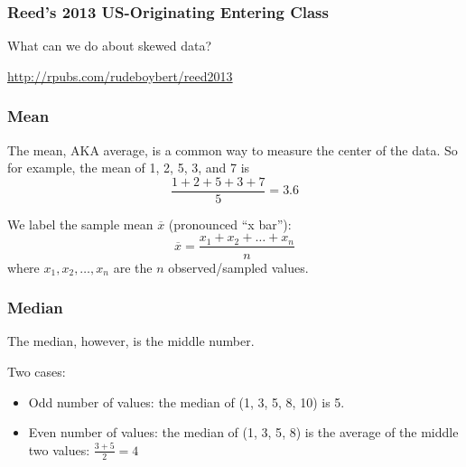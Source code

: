 \documentclass[handout]{beamer}
\newcommand{\blue}[1]{\textcolor{blue2}{#1}}
\begin{document}
\begin{frame}
\frametitle{Reed's 2013 US-Originating Entering Class}
What can we do about skewed data?  

\vspace{1cm}

\blue{\url{http://rpubs.com/rudeboybert/reed2013}}

\end{frame}


\begin{frame}[fragile]
\frametitle{Mean}

%
%
The mean, AKA average, is a common way to measure the \blue{center} of the data.  So for example, the mean of 1, 2, 5, 3, and 7 is 
\[\frac{1 + 2 + 5 + 3 + 7}{5} = 3.6\]

\pause We label the \blue{sample mean} $\overline{x}$ (pronounced ``x bar''):
\[
\overline{x} = \frac{x_1 + x_2 + \ldots + x_n}{n}
\]
where $x_1, x_2, \ldots, x_n$ are the $n$ observed/sampled values.  
\end{frame}


\begin{frame}[fragile]
\frametitle{Median}
%
%
The \blue{median}, however, is the \blue{middle number}.

\vspace{0.5cm}

\pause Two cases:
\begin{itemize}
\item Odd number of values: the median of (1, 3, \blue{5}, 8, 10) is 5.
\item Even number of values: the median of (1, \blue{3, 5}, 8) is the average of the middle two values: $\frac{3+5}{2} = 4$
\end{itemize}

\end{frame}
\end{document}
